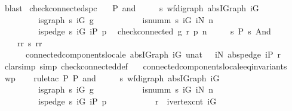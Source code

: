 \begin{isabellebody}
\ blast%
\endisatagproof
{\isafoldproof}%
%
\isadelimproof
\isanewline
%
\endisadelimproof
\isanewline
{}\isamarkupfalse%
\ check{\isacharunderscore}connected{\isacharunderscore}spc{\isacharcolon}\isanewline
\ \ {\isachardoublequoteopen}{\isasymlbrace}\ P\ and\ \isanewline
\ \ \ \ {\isacharparenleft}{\isasymlambda}s{\isachardot}\ wf{\isacharunderscore}digraph\ {\isacharparenleft}abs{\isacharunderscore}IGraph\ iG{\isacharparenright}\ {\isasymand}\ \isanewline
\ \ \ \ \ \ \ \ \ is{\isacharunderscore}graph\ s\ iG\ g\ {\isasymand}\ \isanewline
\ \ \ \ \ \ \ \ \ is{\isacharunderscore}numm\ s\ iG\ iN\ n\ {\isasymand}\ \isanewline
\ \ \ \ \ \ \ \ \ is{\isacharunderscore}pedge\ s\ iG\ iP\ p{\isacharparenright}{\isasymrbrace}\isanewline
\ \ check{\isacharunderscore}connected{\isacharprime}\ g\ r\ p\ n\ \isanewline
\ \ {\isasymlbrace}\ {\isacharparenleft}{\isasymlambda}{\isacharunderscore}\ s{\isachardot}\ P\ s{\isacharparenright}\ And\ \isanewline
\ \ \ \ {\isacharparenleft}{\isasymlambda}rr\ s{\isachardot}\ rr\ {\isasymnoteq}\ {}\ {\isasymlongleftrightarrow}\ \isanewline
\ \ \ \ \ \ connected{\isacharunderscore}components{\isacharunderscore}locale\ {\isacharparenleft}abs{\isacharunderscore}IGraph\ iG{\isacharparenright}\ {\isacharparenleft}unat\ {\isasymcirc}\ \ iN{\isacharparenright}\ {\isacharparenleft}abs{\isacharunderscore}pedge\ iP{\isacharparenright}\ r{\isacharparenright}\ {\isasymrbrace}{\isacharbang}{\isachardoublequoteclose}\isanewline
%
\isadelimproof
\ \ %
\endisadelimproof
%
\isatagproof
{}\isamarkupfalse%
\ {\isacharparenleft}clarsimp\ simp{\isacharcolon}\ check{\isacharunderscore}connected{\isacharprime}{\isacharunderscore}def\ \isanewline
\ \ connected{\isacharunderscore}components{\isacharunderscore}locale{\isacharunderscore}eq{\isacharunderscore}invariants{\isacharprime}{\isacharparenright}\isanewline
\ \ \isamarkupfalse%
\ wp\isanewline
\ \ \isamarkupfalse%
\ {\isacharparenleft}rule{\isacharunderscore}tac\ P{}{\isacharequal}{\isachardoublequoteopen}\ P\ and\ \isanewline
\ \ \ \ {\isacharparenleft}{\isasymlambda}s{\isachardot}\ wf{\isacharunderscore}digraph\ {\isacharparenleft}abs{\isacharunderscore}IGraph\ iG{\isacharparenright}\ {\isasymand}\ \isanewline
\ \ \ \ \ \ \ \ \ is{\isacharunderscore}graph\ s\ iG\ g\ {\isasymand}\ \isanewline
\ \ \ \ \ \ \ \ \ is{\isacharunderscore}numm\ s\ iG\ iN\ n\ {\isasymand}\ \isanewline
\ \ \ \ \ \ \ \ \ is{\isacharunderscore}pedge\ s\ iG\ iP\ p\ {\isasymand}\ \isanewline
\ \ \ \ \ \ \ \ \ r\ {\isacharless}\ ivertex{\isacharunderscore}cnt\ iG\ {\isasymand}\ \isanewline

\end{isabellebody}
